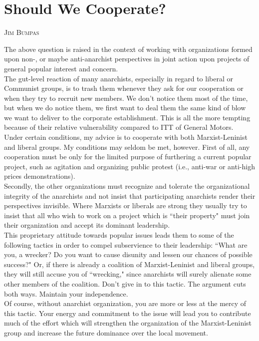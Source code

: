 \documentclass[12pt, onecolumn, letterpaper, oneside]{book}
\makeatletter
\newcommand\chapterauthor[1]{\authortoc{#1}\printchapterauthor{#1}}
\newcommand{\printchapterauthor}[1]{%
  {\parindent0pt\vspace*{-25pt}%
  \linespread{1.1}\large\scshape#1%
  \par\nobreak\vspace*{35pt}}
  \@afterheading%
}
\newcommand{\authortoc}[1]{%
  \addtocontents{toc}{\vskip-10pt}%
  \addtocontents{toc}{%
    \protect\contentsline{chapter}%
    {\hskip1.3em\mdseries\scshape\protect\scriptsize#1}{}{}}
  \addtocontents{toc}{\vskip5pt}%
}
\makeatother
\begin{document}
\chapter{Should We Cooperate?}
\chapterauthor{Jim Bumpas}

The above question is raised in the context of working with organizations formed upon non-, or maybe anti-anarchist perspectives in joint action upon projects of general popular interest and concern.\\
The gut-level reaction of many anarchists, especially in regard to liberal or Communist groups, is to trash them whenever they ask for our cooperation or when they try to recruit new members. We don't notice them most of the time, but when we do notice them, we first want to deal them the same kind of blow we want to deliver to the corporate establishment. This is all the more tempting because of their relative vulnerability compared to ITT of General Motors.\\
Under certain conditions, my advice is to cooperate with both Marxist-Leninist and liberal groups. My conditions may seldom be met, however. First of all, any cooperation must be only for the limited purpose of furthering a current popular project, such as agitation and organizing public protest (i.e., anti-war or anti-high prices demonstrations).\\
Secondly, the other organizations must recognize and tolerate the organizational integrity of the anarchists and not insist that participating anarchists render their perspectives invisible. Where Marxists or liberals are strong they usually try to insist that all who wish to work on a project which is ``their property" must join their organization and accept its dominant leadership.\\
This proprietary attitude towards popular issues leads them to some of the following tactics in order to compel subservience to their leadership: ``What are you, a wrecker? Do you want to cause disunity and lessen our chances of possible success?" Or, if there is already a coalition of Marxist-Leninist and liberal groups, they will still accuse you of ``wrecking," since anarchists will surely alienate some other members of the coalition. Don't give in to this tactic. The argument cuts both ways. Maintain your independence.\\
Of course, without anarchist organization, you are more or less at the mercy of this tactic. Your energy and commitment to the issue will lead you to contribute much of the effort which will strengthen the organization of the Marxist-Leninist group and increase the future dominance over the local movement.\\
\end{document}
